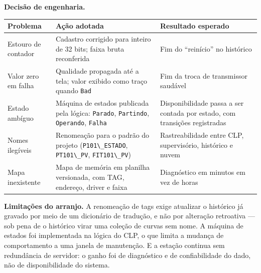 \textbf{Decisão de engenharia.}

\begin{longtable}[]{@{}
  >{\raggedright\arraybackslash}p{}
  >{\raggedright\arraybackslash}p{}
  >{\raggedright\arraybackslash}p{}@{}}
\toprule\noalign{}
\begin{minipage}[b]{\linewidth}\raggedright
Problema
\end{minipage} & \begin{minipage}[b]{\linewidth}\raggedright
Ação adotada
\end{minipage} & \begin{minipage}[b]{\linewidth}\raggedright
Resultado esperado
\end{minipage} \\
\midrule\noalign{}
\endhead
\bottomrule\noalign{}
\endlastfoot
Estouro de contador & Cadastro corrigido para inteiro de 32 bits; faixa bruta reconferida & Fim do ``reinício'' no histórico \\
Valor zero em falha & Qualidade propagada até a tela; valor exibido como traço quando \passthrough{\lstinline!Bad!} & Fim da troca de transmissor saudável \\
Estado ambíguo & Máquina de estados publicada pela lógica: \passthrough{\lstinline!Parado!}, \passthrough{\lstinline!Partindo!}, \passthrough{\lstinline!Operando!}, \passthrough{\lstinline!Falha!} & Disponibilidade passa a ser contada por estado, com transições registradas \\
Nomes ilegíveis & Renomeação para o padrão do projeto (\passthrough{\lstinline!P101\_ESTADO!}, \passthrough{\lstinline!PT101\_PV!}, \passthrough{\lstinline!FIT101\_PV!}) & Rastreabilidade entre CLP, supervisório, histórico e nuvem \\
Mapa inexistente & Mapa de memória em planilha versionada, com TAG, endereço, driver e faixa & Diagnóstico em minutos em vez de horas \\
\end{longtable}

\textbf{Limitações do arranjo.} A renomeação de tags exige atualizar o histórico já gravado por meio de um
dicionário de tradução, e não por alteração retroativa --- sob pena de o histórico virar uma coleção de
curvas sem nome. A máquina de estados foi implementada na lógica do CLP, o que limita a mudança de
comportamento a uma janela de manutenção. E a estação continua sem redundância de servidor: o ganho
foi de diagnóstico e de confiabilidade do dado, não de disponibilidade do sistema.

